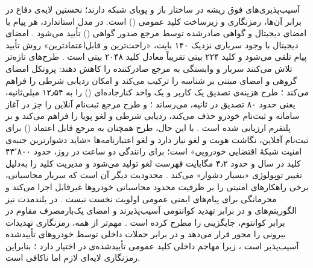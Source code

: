 \documentclass[12pt,a4paper]{article}
\begin{document}
آسیب‌پذیری‌های فوق ریشه در ساختار باز و پویای شبکه دارند؛ نخستین لایه‌ی دفاع در برابر آن‌ها، رمزنگاری و زیرساخت کلید عمومی () است. در مدل استاندارد، هر پیام با امضای دیجیتال و گواهی صادرشده توسط مرجع صدور گواهی () تأیید می‌شود \cite{SecuringVehicularAd}. امضای دیجیتال با وجود سرباری نزدیک ۱۴۰ بایت، «راحت‌ترین و قابل‌اعتمادترین» روش تأیید پیام تلقی می‌شود و کلید ۲۲۴ بیتی  تقریباً معادل کلید ۲۰۴۸ بیتی  است \cite{SecuringVehicularAd}. طرح‌های تازه‌تر تلاش می‌کنند سربار و وابستگی به مرجع صادرکننده را کاهش دهند: پروتکل  امضای گروهی و امضای مبتنی بر شناسه را ترکیب می‌کند و امکان ردیابی شرطی را فراهم می‌کند \cite{linGSISSecurePrivacyPreserving2007}؛ طرح  هزینه‌ی تصدیق یک کاربر و یک واحد کنارجاده‌ای () را به ۱۲٫۵۴ میلی‌ثانیه، یعنی حدود ۸۰ تصدیق در ثانیه، می‌رساند \cite{mariaBAIVEfficientBlockchainBased2022}؛ و طرح  مرجع ثبت‌نام آنلاین را جز در آغاز سامانه و ثبت‌نام خودرو حذف می‌کند، ردیابی شرطی و لغو پویا را فراهم می‌کند و بر پلتفرم  ارزیابی شده است \cite{fengBPASBlockchainAssistedPrivacyPreserving2020}. با این حال، طرح  همچنان به مرجع قابل اعتماد () برای ثبت‌نام آفلاین، نگاشت هویت و لغو نیاز دارد \cite{mariaBAIVEfficientBlockchainBased2022} و لغو اعتبارنامه‌ها «شاید دشوارترین جنبه‌ی امنیت شبکهٔ اقتضایی خودرویی» است؛ برای رانندگی دو ساعت در روز، حدود ۴۳٬۸۰۰ کلید در سال و حدود ۴٫۲ مگابایت فهرست لغو تولید می‌شود \cite{SecuringVehicularAd} و مدیریت کلید را به‌دلیل تغییر توپولوژی «بسیار دشوار» می‌کند \cite{hozouriOverviewVANETVehicular2023}. محدودیت دیگر آن است که سربار محاسباتی، برخی راهکار‌های امنیتی را بر ظرفیت محدود محاسباتی خودرو‌ها غیرقابل اجرا می‌کند \cite{farsimadanReviewSecurityChallenges2025} و محرمانگی برای پیام‌های ایمنی عمومی  اولویت نخست نیست \cite{farsimadanReviewSecurityChallenges2025, SecuringVehicularAd}. در بلندمدت نیز الگوریتم‌های  و  در برابر تهدید کوانتومی آسیب‌پذیرند و امضای یک‌بارمصرف مقاوم در برابر کوانتوم، جایگزینی را مطرح کرده است \cite{sealeyIOTATangle202022}. مهم‌تر از همه، رمزنگاری تهدیدات بیرونی را محور قرار می‌دهد و در برابر حملات داخلی توسط خودرو‌های تأییدشده آسیب‌پذیر است \cite{farsimadanReviewSecurityChallenges2025}، زیرا مهاجم داخلی کلید عمومی تأییدشده‌ی در اختیار دارد \cite{SecuringVehicularAd}؛ بنابراین رمزنگاری لایه‌ای لازم اما ناکافی است.
\end{document}
